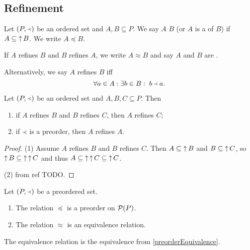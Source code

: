 \subsection{Refinement}
\begin{definition}
Let $\left( P,\Yleft \right)$ be an ordered set and $A,B \subseteq P$. We say $A$  $B$ (or $A$ is a  of $B$) if $A\subseteq \operatorname{\uparrow} B$. We write $A \preceq B$.

If $A$ refines $B$ and $B$ refines $A$, we write $A \approx B$ and say $A$ and $B$ are .
\end{definition}

Alternatively, we say $A$ refines $B$ iff
\[ \forall a\in A: \exists b\in B: \; b \Yleft a. \]

\begin{lemma}
Let $\left( P,\Yleft \right)$ be an ordered set and $A,B,C \subseteq P$. Then
\begin{enumerate}
\item if $A$ refines $B$ and $B$ refines $C$, then $A$ refines $C$;
\item if $\Yleft$ is a preorder, then $A$ refines $A$.
\end{enumerate}
\end{lemma}
\begin{proof}
(1) Assume $A$ refines $B$ and $B$ refines $C$. Then $A \subseteq \operatorname{\uparrow} B$ and $B\subseteq \operatorname{\uparrow} C$, so $\operatorname{\uparrow} B \subseteq \operatorname{\uparrow}\operatorname{\uparrow} C$ and thus $A \subseteq \operatorname{\uparrow}\operatorname{\uparrow} C \subseteq \operatorname{\uparrow} C$.

(2) from  ref TODO.
\end{proof}
\begin{corollary}
Let $\left( P,\Yleft \right)$ be a preordered set.
\begin{enumerate}
\item The relation $\preceq$ is a preorder on $\operatorname{\mathcal{P}}(P)$.
\item The relation $\approx$ is an equivalence relation.
\end{enumerate}
\end{corollary}
The equivalence relation is the equivalence from \ref{preorderEquivalence}.


